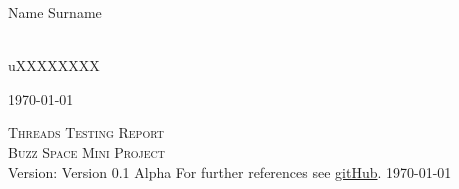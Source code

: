\documentclass[a4paper,12pt]{report}
\begin{document}
\begin{titlepage}
\begin{center}
\begin{minipage}{0.4\textwidth}
\end{minipage}
\begin{minipage}{0.4\textwidth}
\begin{flushleft} \large
Name {Surname}
\end{flushleft}
\end{minipage}
\begin{minipage}{0.4\textwidth}
\begin{flushright} \large
\emph{} \\
uXXXXXXXX
\end{flushright}
\end{minipage}
\vfill
{\large \today}
\end{center}
\end{titlepage}
%

\renewcommand{\thesection}{\arabic{section}}
\newpage
\begin{center}
\textsc{\LARGE Threads Testing Report}\\[1.5cm]
\textsc{\Large Buzz Space Mini Project}\\[0.5cm]
Version: Version 0.1 Alpha 
For further references see \href{https://github.com/thepickpocket/ThreadsTesting}{gitHub}.
\today
\end{center}

\pagebreak

\end{document}
